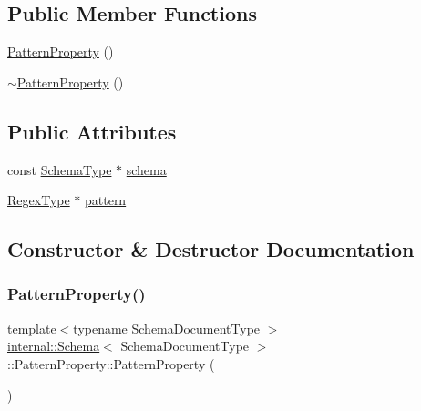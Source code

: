 \subsection*{Public Member Functions}
\begin{DoxyCompactItemize}
\item 
\hyperlink{structinternal_1_1Schema_1_1PatternProperty_ae06e9d9043bb875a86472c9a04cc444e}{Pattern\+Property} ()
\item 
\hyperlink{structinternal_1_1Schema_1_1PatternProperty_a4ebfb03edef09fbd78eea559bf4a2cb7}{$\sim$\+Pattern\+Property} ()
\end{DoxyCompactItemize}
\subsection*{Public Attributes}
\begin{DoxyCompactItemize}
\item 
const \hyperlink{classinternal_1_1Schema_ac2556ebf7a7db971e1c1c0f76eb5786e}{Schema\+Type} $\ast$ \hyperlink{structinternal_1_1Schema_1_1PatternProperty_a65ecc81b35a5936513672c38205d578e}{schema}
\item 
\hyperlink{classinternal_1_1Schema_a78fd42fda3cecdad0ee56559b4e3cec6}{Regex\+Type} $\ast$ \hyperlink{structinternal_1_1Schema_1_1PatternProperty_a52c485e7fa37197653d98c38be878e4a}{pattern}
\end{DoxyCompactItemize}


\subsection{Constructor \& Destructor Documentation}
\mbox{\label{structinternal_1_1Schema_1_1PatternProperty_ae06e9d9043bb875a86472c9a04cc444e}} 
\subsubsection{\texorpdfstring{Pattern\+Property()}{PatternProperty()}}
{\footnotesize\ttfamily template$<$typename Schema\+Document\+Type $>$ \\
\hyperlink{classinternal_1_1Schema}{internal\+::\+Schema}$<$ Schema\+Document\+Type $>$\+::Pattern\+Property\+::\+Pattern\+Property (\begin{DoxyParamCaption}{ }\end{DoxyParamCaption})\hspace{0.3cm}{\ttfamily [inline]}}

